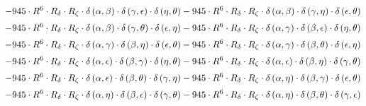 \begin{subequations}
\begin{gather}
 \\[0.2em] \notag 		 - 945 \cdot R^{6} \cdot R_{\delta{}} \cdot R_{\zeta{}} \cdot \delta{}\left(\alpha{}, \beta{}\right) \cdot \delta{}\left(\gamma{}, \epsilon{}\right) \cdot \delta{}\left(\eta{}, \theta{}\right)- 945 \cdot R^{6} \cdot R_{\delta{}} \cdot R_{\zeta{}} \cdot \delta{}\left(\alpha{}, \beta{}\right) \cdot \delta{}\left(\gamma{}, \eta{}\right) \cdot \delta{}\left(\epsilon{}, \theta{}\right) 
 \\[0.2em] \notag 		 - 945 \cdot R^{6} \cdot R_{\delta{}} \cdot R_{\zeta{}} \cdot \delta{}\left(\alpha{}, \beta{}\right) \cdot \delta{}\left(\gamma{}, \theta{}\right) \cdot \delta{}\left(\epsilon{}, \eta{}\right)- 945 \cdot R^{6} \cdot R_{\delta{}} \cdot R_{\zeta{}} \cdot \delta{}\left(\alpha{}, \gamma{}\right) \cdot \delta{}\left(\beta{}, \epsilon{}\right) \cdot \delta{}\left(\eta{}, \theta{}\right) 
 \\[0.2em] \notag 		 - 945 \cdot R^{6} \cdot R_{\delta{}} \cdot R_{\zeta{}} \cdot \delta{}\left(\alpha{}, \gamma{}\right) \cdot \delta{}\left(\beta{}, \eta{}\right) \cdot \delta{}\left(\epsilon{}, \theta{}\right)- 945 \cdot R^{6} \cdot R_{\delta{}} \cdot R_{\zeta{}} \cdot \delta{}\left(\alpha{}, \gamma{}\right) \cdot \delta{}\left(\beta{}, \theta{}\right) \cdot \delta{}\left(\epsilon{}, \eta{}\right) 
 \\[0.2em] \notag 		 - 945 \cdot R^{6} \cdot R_{\delta{}} \cdot R_{\zeta{}} \cdot \delta{}\left(\alpha{}, \epsilon{}\right) \cdot \delta{}\left(\beta{}, \gamma{}\right) \cdot \delta{}\left(\eta{}, \theta{}\right)- 945 \cdot R^{6} \cdot R_{\delta{}} \cdot R_{\zeta{}} \cdot \delta{}\left(\alpha{}, \epsilon{}\right) \cdot \delta{}\left(\beta{}, \eta{}\right) \cdot \delta{}\left(\gamma{}, \theta{}\right) 
 \\[0.2em] \notag 		 - 945 \cdot R^{6} \cdot R_{\delta{}} \cdot R_{\zeta{}} \cdot \delta{}\left(\alpha{}, \epsilon{}\right) \cdot \delta{}\left(\beta{}, \theta{}\right) \cdot \delta{}\left(\gamma{}, \eta{}\right)- 945 \cdot R^{6} \cdot R_{\delta{}} \cdot R_{\zeta{}} \cdot \delta{}\left(\alpha{}, \eta{}\right) \cdot \delta{}\left(\beta{}, \gamma{}\right) \cdot \delta{}\left(\epsilon{}, \theta{}\right) 
 \\[0.2em] \notag 		 - 945 \cdot R^{6} \cdot R_{\delta{}} \cdot R_{\zeta{}} \cdot \delta{}\left(\alpha{}, \eta{}\right) \cdot \delta{}\left(\beta{}, \epsilon{}\right) \cdot \delta{}\left(\gamma{}, \theta{}\right)- 945 \cdot R^{6} \cdot R_{\delta{}} \cdot R_{\zeta{}} \cdot \delta{}\left(\alpha{}, \eta{}\right) \cdot \delta{}\left(\beta{}, \theta{}\right) \cdot \delta{}\left(\gamma{}, \epsilon{}\right) 

\end{gather}
\end{subequations}
